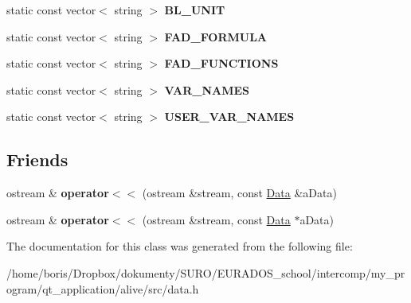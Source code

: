 \begin{DoxyCompactItemize}
\item 
\hypertarget{classData_a4d4ce75a1ee77aefa4b07fc1a1eb48de}{static const vector$<$ string $>$ {\bfseries B\-L\-\_\-\-U\-N\-I\-T}}\label{classData_a4d4ce75a1ee77aefa4b07fc1a1eb48de}

\item 
\hypertarget{classData_a7ab8ae598a0ca941084eeee32efaa020}{static const vector$<$ string $>$ {\bfseries F\-A\-D\-\_\-\-F\-O\-R\-M\-U\-L\-A}}\label{classData_a7ab8ae598a0ca941084eeee32efaa020}

\item 
\hypertarget{classData_a3f6d7e3759cb32957f672d89f05ab1c4}{static const vector$<$ string $>$ {\bfseries F\-A\-D\-\_\-\-F\-U\-N\-C\-T\-I\-O\-N\-S}}\label{classData_a3f6d7e3759cb32957f672d89f05ab1c4}

\item 
\hypertarget{classData_a61473370adeb3358cfe77f92f33435a7}{static const vector$<$ string $>$ {\bfseries V\-A\-R\-\_\-\-N\-A\-M\-E\-S}}\label{classData_a61473370adeb3358cfe77f92f33435a7}

\item 
\hypertarget{classData_a351402311bf9bc250c788e59b015841c}{static const vector$<$ string $>$ {\bfseries U\-S\-E\-R\-\_\-\-V\-A\-R\-\_\-\-N\-A\-M\-E\-S}}\label{classData_a351402311bf9bc250c788e59b015841c}

\end{DoxyCompactItemize}
\subsection*{Friends}
\begin{DoxyCompactItemize}
\item 
\hypertarget{classData_ac9e8b1958e329799e87880d3fab3df57}{ostream \& {\bfseries operator$<$$<$} (ostream \&stream, const \hyperlink{classData}{Data} \&a\-Data)}\label{classData_ac9e8b1958e329799e87880d3fab3df57}

\item 
\hypertarget{classData_a22dfb8fe66795dc99d59323402e68810}{ostream \& {\bfseries operator$<$$<$} (ostream \&stream, const \hyperlink{classData}{Data} $\ast$a\-Data)}\label{classData_a22dfb8fe66795dc99d59323402e68810}

\end{DoxyCompactItemize}


The documentation for this class was generated from the following file\-:\begin{DoxyCompactItemize}
\item 
/home/boris/\-Dropbox/dokumenty/\-S\-U\-R\-O/\-E\-U\-R\-A\-D\-O\-S\-\_\-school/intercomp/my\-\_\-program/qt\-\_\-application/alive/src/data.\-h\end{DoxyCompactItemize}
